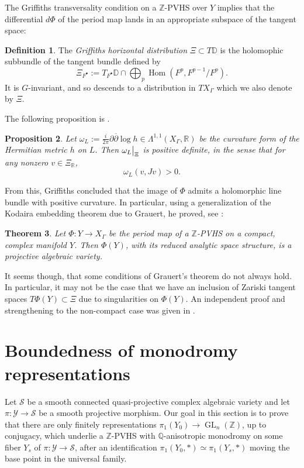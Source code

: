 \documentclass[10pt,letterpaper,english,reqno]{amsart}
\numberwithin{equation}{subsection}
\newcommand\cS{{\mathcal S}}
\newcommand\cY{{\mathcal Y}}
\newcommand\bD{{\mathbb D}}
\newcommand\Q{{\mathbb Q}}
\newcommand\R{{\mathbb R}}
\newcommand\Z{{\mathbb Z}}
\DeclareMathOperator{\GL}{GL}
\DeclareMathOperator{\Hom}{Hom}
\newtheorem{theorem}{Theorem}[section]
\newtheorem{proposition}[theorem]{Proposition}
\theoremstyle{definition}
\newtheorem{definition}[theorem]{Definition}
\begin{document}
The Griffiths transversality condition on a $\Z$-PVHS
over $Y$ implies that the differential $d\Phi$ of the period
map lands in an appropriate subspace of the tangent space:


\begin{definition} The {\it Griffiths horizontal distribution}
$\Xi\subset T\bD$ is the  holomophic subbundle of the tangent
bundle defined by $$\Xi_{F^\bullet}:=T_{F^\bullet}\bD \cap 
\textstyle \bigoplus_p \Hom(F^p,F^{p-1}/F^p).$$ It is 
$G$-invariant, and so descends to a distribution in 
$TX_\Gamma$ which we also denote by $\Xi$. \end{definition}

The following proposition is 
\cite[Prop.~7.15]{griffithsIII}.

\begin{proposition} Let $\omega_L:=\frac{i}{2\pi}\partial 
\overline{\partial} \log h\in \Lambda^{1,1}(X_\Gamma, \R)$ 
be the curvature form of the Hermitian metric $h$ on $L$. 
Then $\omega_L\big{|}_{\Xi}$ is positive definite, in the sense 
that for any nonzero $v\in \Xi_\R$, 
$$\omega_L(v,Jv)>0.$$\end{proposition}

From this, Griffiths concluded that the image 
of $\Phi$ admits a holomorphic line bundle with positive 
curvature. In particular, using a generalization of the 
Kodaira embedding theorem due to Grauert, he proved, see 
\cite[Thm.~9.7]{griffithsIII}:

\begin{theorem} Let $\Phi\colon Y\to X_\Gamma$ be the 
period map of a $\Z$-PVHS on a compact, complex manifold $Y$. 
Then $\Phi(Y)$, with its reduced analytic space structure,
is a projective algebraic variety.\end{theorem}

 It seems though, that some conditions of Grauert's
 theorem do not always hold.
 In particular, it may not be the case that we have an inclusion of Zariski tangent spaces
 $T\Phi(Y)\subset \Xi$ due to singularities on $\Phi(Y)$.
 An independent proof and strengthening to the 
 non-compact case was given in
 \cite[Thm.~1.1]{bakker-brunebarbe-tsimerman}.

\section{Boundedness of monodromy representations}

Let $\cS$ be a smooth connected quasi-projective complex algebraic variety and let $\pi:\cY\to \cS$ be a smooth projective morphism. Our goal in this section is to prove that there are only finitely representations $\pi_1(Y_0)\rightarrow 
\GL_n(\Z)$, up to conjugacy,
which underlie a $\Z$-PVHS with $\Q$-anisotropic monodromy on some fiber $Y_s$ of $\pi:\cY\rightarrow\cS$, after an identification $\pi_1(Y_0,*)\simeq\pi_1(Y_s,*)$ moving the base point
in the universal family.
\end{document}

